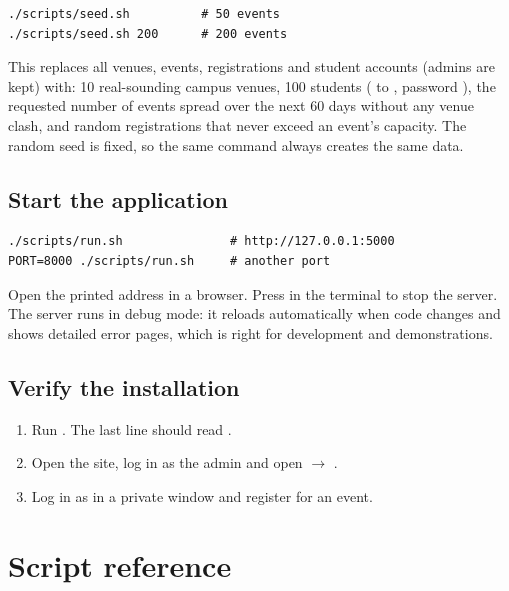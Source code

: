 \documentclass[11pt,a4paper]{article}
\begin{document}
\begin{lstlisting}[style=shell]
./scripts/seed.sh          # 50 events
./scripts/seed.sh 200      # 200 events
\end{lstlisting}

This replaces all venues, events, registrations and student accounts (admins are kept) with:
10 real-sounding campus venues, 100 students ( to
, password ), the requested number of events spread
over the next 60 days without any venue clash, and random registrations that never exceed an
event's capacity. The random seed is fixed, so the same command always creates the same data.

\subsection{Start the application}

\begin{lstlisting}[style=shell]
./scripts/run.sh               # http://127.0.0.1:5000
PORT=8000 ./scripts/run.sh     # another port
\end{lstlisting}

Open the printed address in a browser. Press  in the terminal to stop the server. The
server runs in debug mode: it reloads automatically when code changes and shows detailed error
pages, which is right for development and demonstrations.

\subsection{Verify the installation}

\begin{enumerate}
  \item Run . The last line should read .
  \item Open the site, log in as the admin and open  $\rightarrow$ .
  \item Log in as  in a private window and register for an event.
\end{enumerate}

\section{Script reference}
\end{document}
